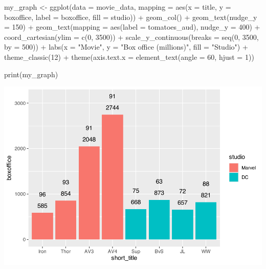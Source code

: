 \documentclass[
]{krantz}
\makeatletter
\newenvironment{Shaded}{\begin{snugshade}}{\end{snugshade}}
\newcommand{\AttributeTok}[1]{\textcolor[rgb]{0.61,0.61,0.61}{#1}}
\newcommand{\DecValTok}[1]{\textcolor[rgb]{0.06,0.06,0.06}{#1}}
\newcommand{\FunctionTok}[1]{\textcolor[rgb]{0,0,0}{#1}}
\newcommand{\NormalTok}[1]{#1}
\newcommand{\OtherTok}[1]{\textcolor[rgb]{0.37,0.37,0.37}{#1}}
\newcommand{\SpecialCharTok}[1]{\textcolor[rgb]{0,0,0}{#1}}
\newcommand{\StringTok}[1]{\textcolor[rgb]{0.5,0.5,0.5}{#1}}
\newenvironment{kframe}{%
\medskip{}
\setlength{\fboxsep}{.8em}
 \def\at@end@of@kframe{}%
 \ifinner\ifhmode%
  \def\at@end@of@kframe{\end{minipage}}%
  \begin{minipage}{\columnwidth}%
 \fi\fi%
 \def\FrameCommand##1{\hskip\@totalleftmargin \hskip-\fboxsep
 \colorbox{shadecolor}{##1}\hskip-\fboxsep
     \hskip-\linewidth \hskip-\@totalleftmargin \hskip\columnwidth}%
 \MakeFramed {\advance\hsize-\width
   \@totalleftmargin\z@ \linewidth\hsize
   \@setminipage}}%
 {\par\unskip\endMakeFramed%
 \at@end@of@kframe}
\renewenvironment{Shaded}{\begin{kframe}}{\end{kframe}}
\makeatother
\begin{document}
\begin{Shaded}
\begin{Highlighting}[]
\NormalTok{my\_graph }\OtherTok{\textless{}{-}} \FunctionTok{ggplot}\NormalTok{(}\AttributeTok{data =}\NormalTok{ movie\_data,}
           \AttributeTok{mapping =} \FunctionTok{aes}\NormalTok{(}\AttributeTok{x =}\NormalTok{ title,}
                         \AttributeTok{y =}\NormalTok{ boxoffice,}
                         \AttributeTok{label =}\NormalTok{ boxoffice, }
                         \AttributeTok{fill =}\NormalTok{ studio)) }\SpecialCharTok{+}
  \FunctionTok{geom\_col}\NormalTok{() }\SpecialCharTok{+}
  \FunctionTok{geom\_text}\NormalTok{(}\AttributeTok{nudge\_y =} \DecValTok{150}\NormalTok{)  }\SpecialCharTok{+}
  \FunctionTok{geom\_text}\NormalTok{(}\AttributeTok{mapping =} \FunctionTok{aes}\NormalTok{(}\AttributeTok{label =}\NormalTok{ tomatoes\_aud), }
            \AttributeTok{nudge\_y =} \DecValTok{400}\NormalTok{) }\SpecialCharTok{+}
  \FunctionTok{coord\_cartesian}\NormalTok{(}\AttributeTok{ylim =} \FunctionTok{c}\NormalTok{(}\DecValTok{0}\NormalTok{, }\DecValTok{3500}\NormalTok{)) }\SpecialCharTok{+}
  \FunctionTok{scale\_y\_continuous}\NormalTok{(}\AttributeTok{breaks =} \FunctionTok{seq}\NormalTok{(}\DecValTok{0}\NormalTok{, }\DecValTok{3500}\NormalTok{, }\AttributeTok{by =} \DecValTok{500}\NormalTok{)) }\SpecialCharTok{+}
  \FunctionTok{labs}\NormalTok{(}\AttributeTok{x =} \StringTok{"Movie"}\NormalTok{,}
       \AttributeTok{y =} \StringTok{"Box office (millions)"}\NormalTok{,}
       \AttributeTok{fill =} \StringTok{"Studio"}\NormalTok{) }\SpecialCharTok{+}
  \FunctionTok{theme\_classic}\NormalTok{(}\DecValTok{12}\NormalTok{) }\SpecialCharTok{+}
  \FunctionTok{theme}\NormalTok{(}\AttributeTok{axis.text.x =} \FunctionTok{element\_text}\NormalTok{(}\AttributeTok{angle =} \DecValTok{60}\NormalTok{, }
                                   \AttributeTok{hjust =} \DecValTok{1}\NormalTok{))  }

\FunctionTok{print}\NormalTok{(my\_graph)}
\end{Highlighting}
\end{Shaded}

\includegraphics[width=0.65\linewidth]{bookdown_files/figure-latex/unnamed-chunk-120-1}
\end{document}
